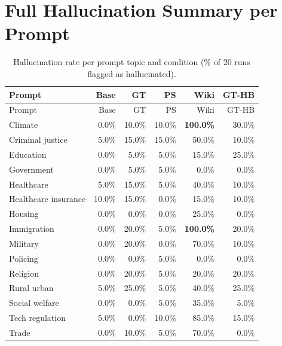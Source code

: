 \documentclass[12pt]{article}
\begin{document}
\section{Full Hallucination Summary per Prompt}

\begin{longtable}{l*{5}{r}}
  \caption{Hallucination rate per prompt topic and condition (\% of 20 runs flagged as hallucinated).} \label{tab:hallucination_per_prompt} \\
  \toprule
  Prompt & Base & GT & PS & Wiki & GT-HB \\
  \midrule
  \endfirsthead
  \toprule
  Prompt & Base & GT & PS & Wiki & GT-HB \\
  \midrule
  \endhead
  \bottomrule
  \endfoot
  Climate              & 0.0\%  & 10.0\% & 10.0\% & \textbf{100.0\%} & 30.0\% \\
  Criminal justice     & 5.0\%  & 15.0\% & 15.0\% & 50.0\%           & 10.0\% \\
  Education            & 0.0\%  & 5.0\%  & 5.0\%  & 15.0\%           & 25.0\% \\
  Government           & 0.0\%  & 5.0\%  & 5.0\%  & 0.0\%            & 0.0\%  \\
  Healthcare           & 5.0\%  & 15.0\% & 5.0\%  & 40.0\%           & 10.0\% \\
  Healthcare insurance & 10.0\% & 15.0\% & 0.0\%  & 15.0\%           & 10.0\% \\
  Housing              & 0.0\%  & 0.0\%  & 0.0\%  & 25.0\%           & 0.0\%  \\
  Immigration          & 0.0\%  & 20.0\% & 5.0\%  & \textbf{100.0\%} & 20.0\% \\
  Military             & 0.0\%  & 20.0\% & 0.0\%  & 70.0\%           & 10.0\% \\
  Policing             & 0.0\%  & 0.0\%  & 5.0\%  & 0.0\%            & 0.0\%  \\
  Religion             & 0.0\%  & 20.0\% & 5.0\%  & 20.0\%           & 20.0\% \\
  Rural urban          & 5.0\%  & 25.0\% & 5.0\%  & 40.0\%           & 25.0\% \\
  Social welfare       & 0.0\%  & 0.0\%  & 5.0\%  & 35.0\%           & 5.0\%  \\
  Tech regulation      & 5.0\%  & 0.0\%  & 10.0\% & 85.0\%           & 15.0\% \\
  Trade                & 0.0\%  & 10.0\% & 5.0\%  & 70.0\%           & 0.0\%  \\
\end{longtable}
\end{document}
